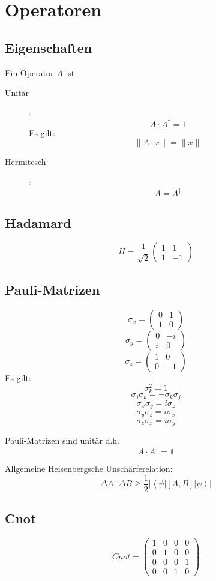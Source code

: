 \documentclass{article}
\begin{document}
\section{Operatoren}
\subsection{Eigenschaften}
Ein Operator $A$ ist
\begin{description}
\item[Unitär]:
  \[ A\cdot A^\dagger = 1 \]
  Es gilt:
  \[ \| A\cdot x \| = \| x \| \]
\item[Hermitesch]:
  \[ A = A^\dagger \]
\end{description}
\subsection{Hadamard}

\[ H = \frac{1}{\sqrt{2}}\left(\begin{array}{rr}
    1 &  1\\
    1 & -1
  \end{array}\right) \]
\subsection{Pauli-Matrizen}
\[ \sigma_x = \left(\begin{array}{rr}
    0 & 1\\
    1 & 0
  \end{array} \right) \]
\[ \sigma_y = \left(\begin{array}{rr}
    0 & -i\\
    i & 0
  \end{array} \right) \]
\[ \sigma_z = \left(\begin{array}{rr}
    1 & 0\\
    0 & -1
  \end{array}\right) \]
Es gilt:
\[ \sigma_k^2 = 1 \]
\[ \sigma_j\sigma_k = -\sigma_k\sigma_j \]
\[ \sigma_x\sigma_y = i\sigma_z \]
\[ \sigma_y\sigma_z = i\sigma_x \]
\[ \sigma_z\sigma_x = i\sigma_y \]

Pauli-Matrizen sind unitär d.h. 
\[ A \cdot A^{\dagger} = \mathbb{1} \]


Allgemeine Heisenbergsche Unschärferelation:
\[ \Delta A \cdot \Delta B \ge \frac{1}{2} |\left<\psi|[A,B]|\psi\right>| \]

  
\subsection{Cnot}
\[ Cnot = \left(\begin{array}{rrrr}
    1 & 0 & 0 & 0\\
    0 & 1 & 0 & 0\\
    0 & 0 & 0 & 1\\
    0 & 0 & 1 & 0
  \end{array}\right) \]
\end{document}
